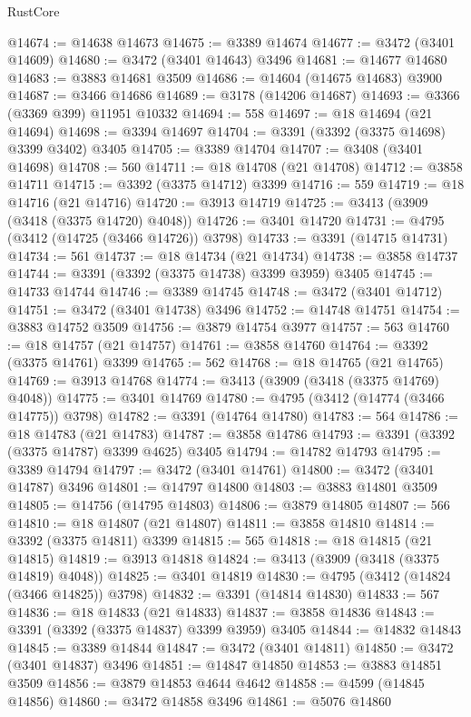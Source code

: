 \begin{lexlean}{RustCore}
\begin{coremodule}
@14674 := @14638 @14673
@14675 := @3389 @14674
@14677 := @3472 (@3401 @14609)
@14680 := @3472 (@3401 @14643) @3496
@14681 := @14677 @14680
@14683 := @3883 @14681 @3509
@14686 := @14604 (@14675 @14683) @3900
@14687 := @3466 @14686
@14689 := @3178 (@14206 @14687)
@14693 := @3366 (@3369 @399) @11951 @10332
@14694 := 558
@14697 := @18 @14694 (@21 @14694)
@14698 := @3394 @14697
@14704 := @3391 (@3392 (@3375 @14698) @3399 @3402) @3405
@14705 := @3389 @14704
@14707 := @3408 (@3401 @14698)
@14708 := 560
@14711 := @18 @14708 (@21 @14708)
@14712 := @3858 @14711
@14715 := @3392 (@3375 @14712) @3399
@14716 := 559
@14719 := @18 @14716 (@21 @14716)
@14720 := @3913 @14719
@14725 := @3413 (@3909 (@3418 (@3375 @14720) @4048))
@14726 := @3401 @14720
@14731 := @4795 (@3412 (@14725 (@3466 @14726)) @3798)
@14733 := @3391 (@14715 @14731)
@14734 := 561
@14737 := @18 @14734 (@21 @14734)
@14738 := @3858 @14737
@14744 := @3391 (@3392 (@3375 @14738) @3399 @3959) @3405
@14745 := @14733 @14744
@14746 := @3389 @14745
@14748 := @3472 (@3401 @14712)
@14751 := @3472 (@3401 @14738) @3496
@14752 := @14748 @14751
@14754 := @3883 @14752 @3509
@14756 := @3879 @14754 @3977
@14757 := 563
@14760 := @18 @14757 (@21 @14757)
@14761 := @3858 @14760
@14764 := @3392 (@3375 @14761) @3399
@14765 := 562
@14768 := @18 @14765 (@21 @14765)
@14769 := @3913 @14768
@14774 := @3413 (@3909 (@3418 (@3375 @14769) @4048))
@14775 := @3401 @14769
@14780 := @4795 (@3412 (@14774 (@3466 @14775)) @3798)
@14782 := @3391 (@14764 @14780)
@14783 := 564
@14786 := @18 @14783 (@21 @14783)
@14787 := @3858 @14786
@14793 := @3391 (@3392 (@3375 @14787) @3399 @4625) @3405
@14794 := @14782 @14793
@14795 := @3389 @14794
@14797 := @3472 (@3401 @14761)
@14800 := @3472 (@3401 @14787) @3496
@14801 := @14797 @14800
@14803 := @3883 @14801 @3509
@14805 := @14756 (@14795 @14803)
@14806 := @3879 @14805
@14807 := 566
@14810 := @18 @14807 (@21 @14807)
@14811 := @3858 @14810
@14814 := @3392 (@3375 @14811) @3399
@14815 := 565
@14818 := @18 @14815 (@21 @14815)
@14819 := @3913 @14818
@14824 := @3413 (@3909 (@3418 (@3375 @14819) @4048))
@14825 := @3401 @14819
@14830 := @4795 (@3412 (@14824 (@3466 @14825)) @3798)
@14832 := @3391 (@14814 @14830)
@14833 := 567
@14836 := @18 @14833 (@21 @14833)
@14837 := @3858 @14836
@14843 := @3391 (@3392 (@3375 @14837) @3399 @3959) @3405
@14844 := @14832 @14843
@14845 := @3389 @14844
@14847 := @3472 (@3401 @14811)
@14850 := @3472 (@3401 @14837) @3496
@14851 := @14847 @14850
@14853 := @3883 @14851 @3509
@14856 := @3879 @14853 @4644 @4642
@14858 := @4599 (@14845 @14856)
@14860 := @3472 @14858 @3496
@14861 := @5076 @14860

\end{coremodule}
\end{lexlean}
